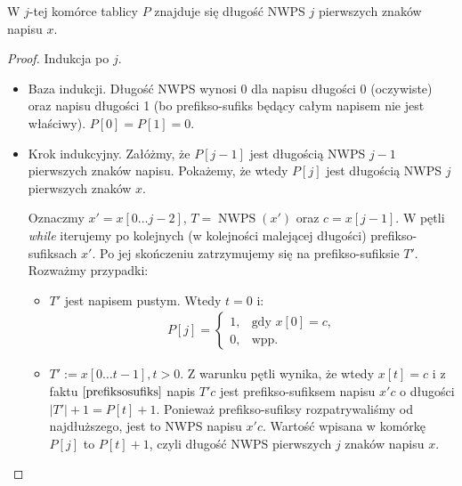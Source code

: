 \begin{theorem}
	W $j$-tej komórce tablicy $P$ znajduje się długość NWPS $j$ pierwszych znaków napisu $x$.
	\begin{proof}
		Indukcja po $j$.
		\begin{itemize}
			\item Baza indukcji. Długość NWPS wynosi 0 dla napisu długości 0 (oczywiste) oraz napisu długości 1 (bo prefikso-sufiks będący całym napisem nie jest właściwy). $P[0]=P[1]=0$.
			\item Krok indukcyjny. Załóżmy, że $P[j-1]$ jest długością NWPS $j-1$ pierwszych znaków napisu. Pokażemy, że wtedy $P[j]$ jest długością NWPS $j$ pierwszych znaków $x$.
			
			Oznaczmy $x' = x[0\dots j-2]$, $T = \operatorname{NWPS}(x')$ oraz $c = x[j-1]$. W pętli \textit{while} iterujemy po kolejnych (w kolejności malejącej długości) prefikso-sufiksach $x'$. Po jej skończeniu zatrzymujemy się na prefikso-sufiksie $T'$. Rozważmy przypadki:
			\begin{itemize}
				\item $T'$ jest napisem pustym. Wtedy $t=0$ i:
				\begin{gather*}
					P[j] = 
					\begin{cases}
						1, & \text{gdy } x[0]=c, \\
						0, & \text{wpp}.
					\end{cases}
				\end{gather*}
				\item $T':=x[0 \dots t-1], t > 0$. Z warunku pętli wynika, że wtedy $x[t]=c$ i z faktu $\ref{prefiksosufiks}$ napis $T'c$ jest prefikso-sufiksem napisu $x'c$ o długości $|T'|+1=P[t]+1$. Ponieważ prefikso-sufiksy rozpatrywaliśmy od najdłuższego, jest to NWPS napisu $x'c$. Wartość wpisana w komórkę $P[j]$ to $P[t]+1$, czyli długość NWPS pierwszych $j$ znaków napisu $x$. \qedhere
			\end{itemize}		 
		\end{itemize}
	\end{proof}
\end{theorem}

